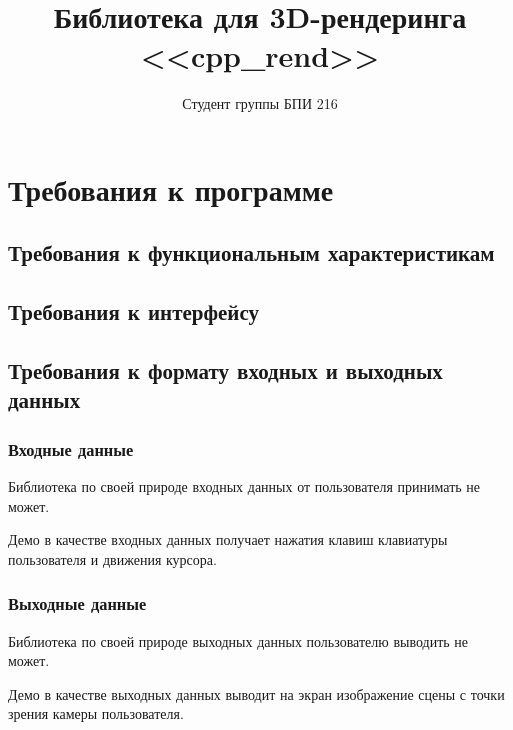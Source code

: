 \documentclass{../TechDoc}
\title{Библиотека для 3D-рендеринга <<cpp\_rend>>}
\author{Студент группы БПИ 216}{Г. А. Сабаев}
\begin{document}
    \maketitle
    
    \tableofcontents
    
    
    
    

    \section{Требования к программе}
    
    \subsection{Требования к функциональным характеристикам}
    
    
        
    \subsection{Требования к интерфейсу}
        
    
 
    \subsection{Требования к формату входных и выходных данных}
    
    \subsubsection{Входные данные}

    Библиотека по своей природе входных данных от пользователя принимать не может.

    Демо в качестве входных данных получает нажатия клавиш клавиатуры пользователя и движения курсора.

    \subsubsection{Выходные данные}
    
    Библиотека по своей природе выходных данных пользователю выводить не может.
    
    Демо в качестве выходных данных выводит на экран изображение сцены с точки зрения камеры пользователя.
\end{document}
